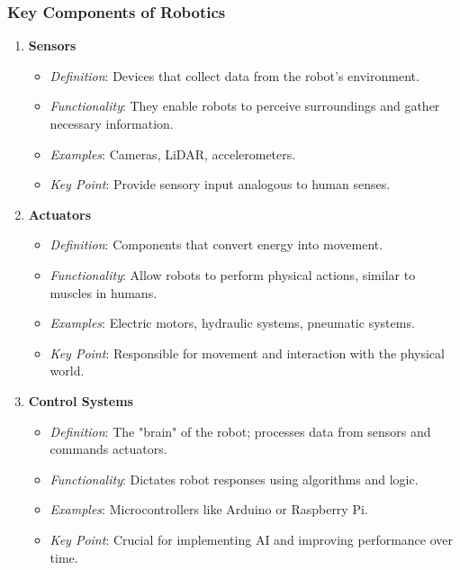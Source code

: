 \documentclass[aspectratio=169]{beamer}
\begin{document}
\begin{frame}[fragile]
    \frametitle{Key Components of Robotics}
    \begin{enumerate}
        \item \textbf{Sensors}
        \begin{itemize}
            \item \textit{Definition}: Devices that collect data from the robot's environment.
            \item \textit{Functionality}: They enable robots to perceive surroundings and gather necessary information.
            \item \textit{Examples}: Cameras, LiDAR, accelerometers.
            \item \textit{Key Point}: Provide sensory input analogous to human senses.
        \end{itemize}
        
        \item \textbf{Actuators}
        \begin{itemize}
            \item \textit{Definition}: Components that convert energy into movement.
            \item \textit{Functionality}: Allow robots to perform physical actions, similar to muscles in humans.
            \item \textit{Examples}: Electric motors, hydraulic systems, pneumatic systems.
            \item \textit{Key Point}: Responsible for movement and interaction with the physical world.
        \end{itemize}
        
        \item \textbf{Control Systems}
        \begin{itemize}
            \item \textit{Definition}: The "brain" of the robot; processes data from sensors and commands actuators.
            \item \textit{Functionality}: Dictates robot responses using algorithms and logic.
            \item \textit{Examples}: Microcontrollers like Arduino or Raspberry Pi.
            \item \textit{Key Point}: Crucial for implementing AI and improving performance over time.
        \end{itemize}
    \end{enumerate}
\end{frame}
\end{document}
